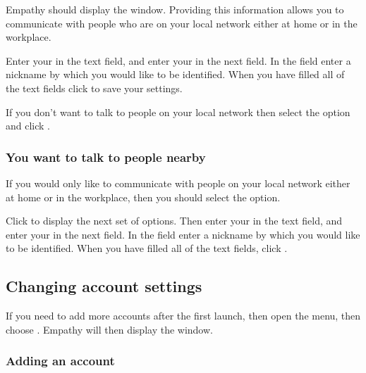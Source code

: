 Empathy should display the  window. 
Providing this information allows you to communicate with people who are on your 
local network either at home or in the workplace. 

Enter your  in the text field, and enter your 
 in the next field. In the  field enter
a nickname by which you would like to be identified. When you have filled all of 
the text fields click  to save your settings. 

If you don't want to talk to people on your local network 
then select the  option
and click .

\subsubsection{You want to talk to people nearby}

If you would only like to communicate with people on your local network either at 
home or in the workplace, then you should select the  option. 

Click  to display the next set of options. Then enter
 your  in the text field, and enter your 
 in the next field. In the  field enter a nickname by which
you would like to be identified. When you have filled all of the text fields,
click .



\subsection {Changing account settings}

If you need to add more accounts after the first launch, then open the 
 menu, then choose . Empathy will then display the 
 window.

\subsubsection{Adding an account}

